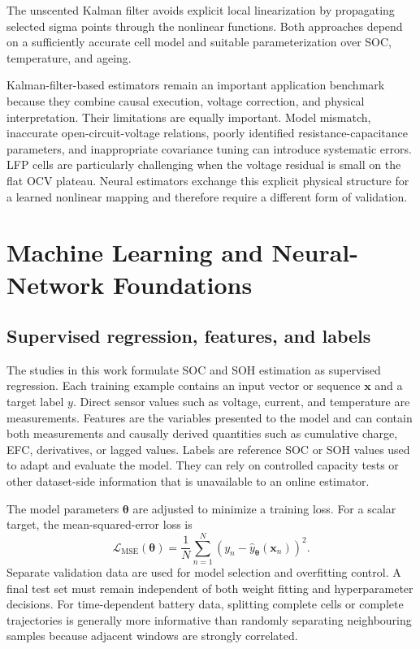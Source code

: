 \documentclass[
    a4paper,
    12pt,
    titlepage,
    bibliography=totoc,
    twoside=on,
    parskip=false,
    numbers=noenddot,
    cleardoublepage=empty,
    DIV=12,
    BCOR=12.0mm,
    headheight=36pt,
    headings=openright
]{scrreprt}
\begin{document}
The unscented Kalman filter avoids explicit local linearization by propagating selected sigma points through the nonlinear functions. Both approaches depend on a sufficiently accurate cell model and suitable parameterization over SOC, temperature, and ageing.\autocite{liJointEstimationState2021,gaoEnhancedStateofchargeEstimation2022,guoSystematicReviewElectrochemical2024}

Kalman-filter-based estimators remain an important application benchmark because they combine causal execution, voltage correction, and physical interpretation. Their limitations are equally important. Model mismatch, inaccurate open-circuit-voltage relations, poorly identified resistance-capacitance parameters, and inappropriate covariance tuning can introduce systematic errors. LFP cells are particularly challenging when the voltage residual is small on the flat OCV plateau. Neural estimators exchange this explicit physical structure for a learned nonlinear mapping and therefore require a different form of validation.

\section{Machine Learning and Neural-Network Foundations}
\subsection{Supervised regression, features, and labels}
The studies in this work formulate SOC and SOH estimation as supervised regression. Each training example contains an input vector or sequence $\mathbf{x}$ and a target label $y$. Direct sensor values such as voltage, current, and temperature are measurements. Features are the variables presented to the model and can contain both measurements and causally derived quantities such as cumulative charge, EFC, derivatives, or lagged values. Labels are reference SOC or SOH values used to adapt and evaluate the model. They can rely on controlled capacity tests or other dataset-side information that is unavailable to an online estimator.

The model parameters $\boldsymbol{\theta}$ are adjusted to minimize a training loss. For a scalar target, the mean-squared-error loss is
\begin{equation}
    \mathcal{L}_{\mathrm{MSE}}(\boldsymbol{\theta})
    =
    \frac{1}{N}\sum_{n=1}^{N}
    \left(y_n-\widehat y_{\boldsymbol{\theta}}(\mathbf{x}_n)\right)^2.
    \label{eq:fundamental_mse}
\end{equation}
Separate validation data are used for model selection and overfitting control. A final test set must remain independent of both weight fitting and hyperparameter decisions. For time-dependent battery data, splitting complete cells or complete trajectories is generally more informative than randomly separating neighbouring samples because adjacent windows are strongly correlated.\autocite{hossainlipuDatadrivenStateCharge2020,zhaoReviewLithiumIonBattery2024}
\end{document}
